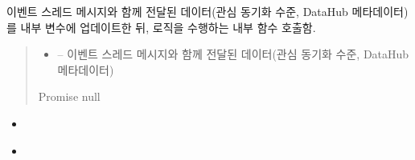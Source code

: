 \documentclass[a4paper,10pt,english]{sphinxmanual}
\begin{document}
\begin{fulllineitems}
\begin{fulllineitems}
\label{\detokenize{_DHSearch:DHSearch._updateInterestInfo}}
\pysigstartsignatures
{}
\pysigstopsignatures
\sphinxAtStartPar
{} 이벤트 스레드 메시지와 함께 전달된 데이터(관심 동기화 수준, DataHub 메타데이터)를
내부 변수에 업데이트한 뒤,  로직을 수행하는 내부 함수 호출함.
\begin{quote}\begin{description}
\begin{itemize}
\item {} 
\sphinxAtStartPar
{} –  이벤트 스레드 메시지와 함께 전달된 데이터(관심 동기화 수준, DataHub 메타데이터)

\end{itemize}

\sphinxAtStartPar
Promise \sphinxhyphen{} null

\end{description}\end{quote}


\nopagebreak

\begin{itemize}
\item {} 
\sphinxAtStartPar
{\hyperref[\detokenize{_DHSearch:DHSearch._dhDaemonListener}]{}}

\item {} 
\sphinxAtStartPar
{\hyperref[\detokenize{_DHSearch:DHSearch.run}]{}}

\end{itemize}



\end{fulllineitems}



\end{fulllineitems}
\end{document}
